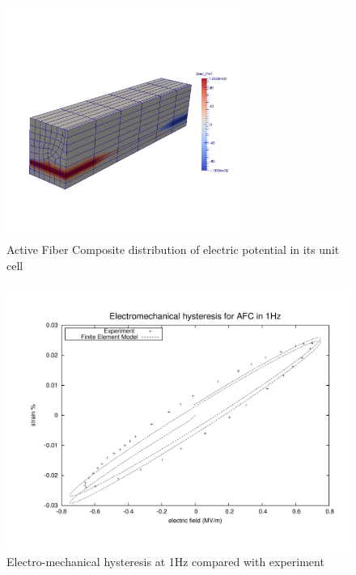 \begin{figure} 
\centering
\includegraphics[width=3.0in]{./chap_4_structural_analyses/afc_unit_cell/afc_electrip_petential_distribution.pdf}
\caption{Active Fiber Composite distribution of electric potential in its unit cell}
\label{fig:electrip_potential_afc_pictur}  
\end{figure}  

\begin{figure} 
\centering
\includegraphics[width=5.0in]{./chap_4_structural_analyses/afc_unit_cell/comparison/afc_result_electric_field_vs_strain.pdf}
\caption{Electro-mechanical hysteresis at 1Hz compared with experiment}
\label{fig:afc_result_electric_field_vs_strain}
\end{figure} 

